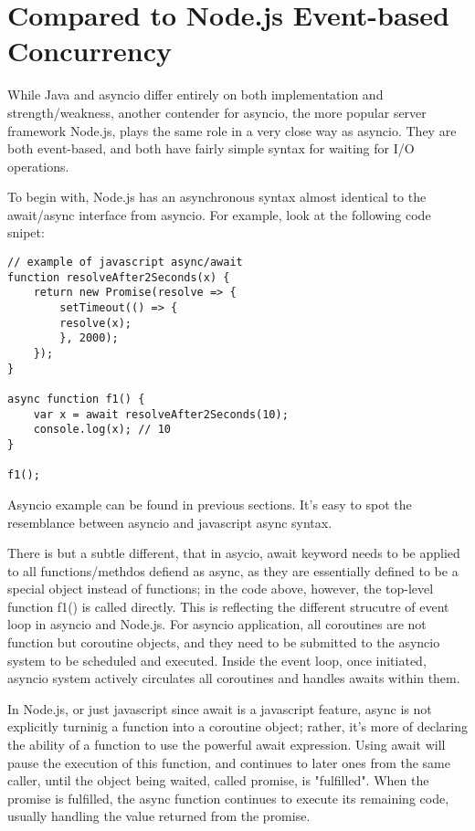 \documentclass[letterpaper,twocolumn,10pt]{article}
\begin{document}
\section{Compared to Node.js Event-based Concurrency}

While Java and asyncio differ entirely on both implementation and strength/weakness, another contender for asyncio, the more popular server framework Node.js, plays the same role in a very close way as asyncio.
They are both event-based, and both have fairly simple syntax for waiting for I/O operations.

To begin with, Node.js has an asynchronous syntax almost identical to the await/async interface from asyncio.
For example, look at the following code snipet:
\begin{lstlisting}[breaklines=true]
// example of javascript async/await
function resolveAfter2Seconds(x) { 
    return new Promise(resolve => {
        setTimeout(() => {
        resolve(x);
        }, 2000);
    });
}
    
async function f1() {
    var x = await resolveAfter2Seconds(10);
    console.log(x); // 10
}
    
f1();
\end{lstlisting}
Asyncio example can be found in previous sections.
It's easy to spot the resemblance between asyncio and javascript async syntax.

There is but a subtle different, that in asycio, await keyword needs to be applied to all functions/methdos defiend as async, as they are essentially defined to be a special object instead of functions;
in the code above, however, the top-level function f1() is called directly.
This is reflecting the different strucutre of event loop in asyncio and Node.js.
For asyncio application, all coroutines are not function but coroutine objects, and they need to be submitted to the asyncio system to be scheduled and executed.
Inside the event loop, once initiated, asyncio system actively circulates all coroutines and handles awaits within them.

In Node.js, or just javascript since await is a javascript feature, async is not explicitly turninig a function into a coroutine object; 
rather, it's more of declaring the ability of a function to use the powerful await expression.
Using await will pause the execution of this function, and continues to later ones from the same caller, until the object being waited, called promise, is "fulfilled".
When the promise is fulfilled, the async function continues to execute its remaining code, usually handling the value returned from the promise.
\end{document}
